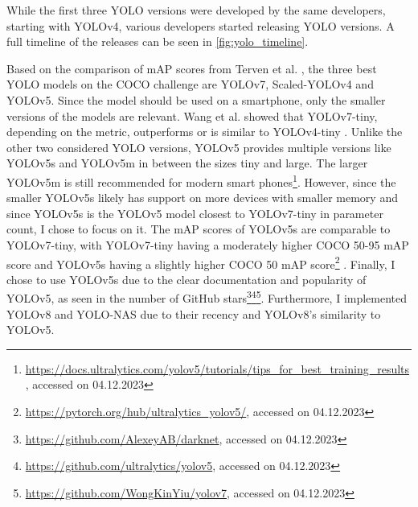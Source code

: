 \documentclass[10pt]{book}
\newcommand{\figureref}[1]{\autoref{#1}}
\begin{document}
While the first three \ac{YOLO} versions were developed by the same developers, starting with \ac{YOLO}v4, various developers started releasing \ac{YOLO} versions. A full timeline of the releases can be seen in \figureref{fig:yolo_timeline}. 

Based on the comparison of \ac{mAP} scores from Terven et al. \cite{terven2023comprehensive}, the three best \ac{YOLO} models on the \ac{COCO} challenge are \ac{YOLO}v7, Scaled-\ac{YOLO}v4 and \ac{YOLO}v5. 
Since the model should be used on a smartphone, only the smaller versions of the models are relevant. Wang et al. showed that \ac{YOLO}v7-tiny, depending on the metric, outperforms or is similar to \ac{YOLO}v4-tiny \cite{wang2023yolov7}. 
Unlike the other two considered \ac{YOLO} versions, \ac{YOLO}v5 provides multiple versions like \ac{YOLO}v5s and \ac{YOLO}v5m in between the sizes tiny and large. 
The larger \ac{YOLO}v5m is still recommended for modern smart phones\footnote{\url{https://docs.ultralytics.com/yolov5/tutorials/tips\_for\_best\_training\_results}, accessed on 04.12.2023}. 
However, since the smaller \ac{YOLO}v5s likely has support on more devices with smaller memory and since \ac{YOLO}v5s is the \ac{YOLO}v5 model closest to \ac{YOLO}v7-tiny in parameter count, I chose to focus on it. %
The \ac{mAP} scores of \ac{YOLO}v5s are comparable to \ac{YOLO}v7-tiny, with \ac{YOLO}v7-tiny having a moderately higher \ac{COCO} 50-95 \ac{mAP} score and \ac{YOLO}v5s having a slightly higher \ac{COCO} 50 \ac{mAP} score\footnote{\url{https://pytorch.org/hub/ultralytics_yolov5/}, accessed on 04.12.2023} \cite{wang2023yolov7}. 
Finally, I chose to use \ac{YOLO}v5s due to the clear documentation and popularity of \ac{YOLO}v5, as seen in the number of GitHub stars\footnote{\url{https://github.com/AlexeyAB/darknet}, accessed on 04.12.2023}\footnote{\url{https://github.com/ultralytics/yolov5}, accessed on 04.12.2023}\footnote{\url{https://github.com/WongKinYiu/yolov7}, accessed on 04.12.2023}. Furthermore, I implemented \ac{YOLO}v8 and \ac{YOLO}-NAS due to their recency and \ac{YOLO}v8's similarity to \ac{YOLO}v5.

\end{document}
